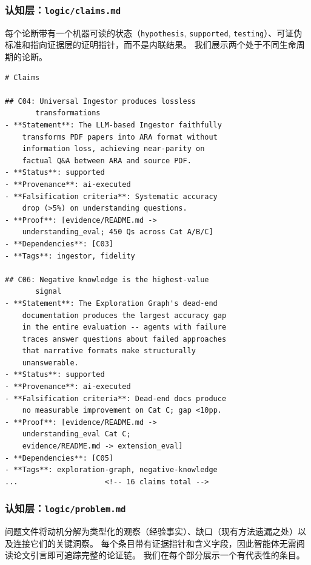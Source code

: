 \subsubsection{认知层：\texttt{logic/claims.md}}

每个论断带有一个机器可读的状态（\texttt{hypothesis}, \texttt{supported}, \texttt{testing}）、可证伪标准和指向证据层的证明指针，而不是内联结果。
我们展示两个处于不同生命周期的论断。

\begin{lstlisting}[basicstyle=\ttfamily\scriptsize]
# Claims

## C04: Universal Ingestor produces lossless
       transformations
- **Statement**: The LLM-based Ingestor faithfully
    transforms PDF papers into ARA format without
    information loss, achieving near-parity on
    factual Q&A between ARA and source PDF.
- **Status**: supported
- **Provenance**: ai-executed
- **Falsification criteria**: Systematic accuracy
    drop (>5%) on understanding questions.
- **Proof**: [evidence/README.md ->
    understanding_eval; 450 Qs across Cat A/B/C]
- **Dependencies**: [C03]
- **Tags**: ingestor, fidelity

## C06: Negative knowledge is the highest-value
       signal
- **Statement**: The Exploration Graph's dead-end
    documentation produces the largest accuracy gap
    in the entire evaluation -- agents with failure
    traces answer questions about failed approaches
    that narrative formats make structurally
    unanswerable.
- **Status**: supported
- **Provenance**: ai-executed
- **Falsification criteria**: Dead-end docs produce
    no measurable improvement on Cat C; gap <10pp.
- **Proof**: [evidence/README.md ->
    understanding_eval Cat C;
    evidence/README.md -> extension_eval]
- **Dependencies**: [C05]
- **Tags**: exploration-graph, negative-knowledge
...                    <!-- 16 claims total -->
\end{lstlisting}

\subsubsection{认知层：\texttt{logic/problem.md}}

问题文件将动机分解为类型化的观察（经验事实）、缺口（现有方法遗漏之处）以及连接它们的关键洞察。
每个条目带有证据指针和含义字段，因此智能体无需阅读论文引言即可追踪完整的论证链。
我们在每个部分展示一个有代表性的条目。

